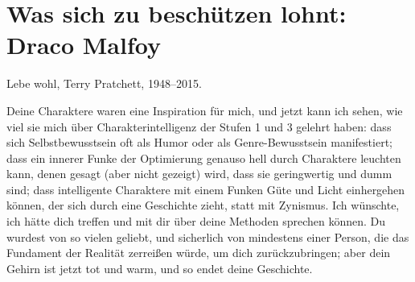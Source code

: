 \chapter{Was sich zu beschützen lohnt: Draco Malfoy}

\begin{chapterOpeningAuthorNote}
Lebe wohl, Terry Pratchett, 1948–2015.

Deine Charaktere waren eine Inspiration für mich, und jetzt kann ich sehen, wie viel sie mich über Charakterintelligenz der Stufen 1 und 3 gelehrt haben: dass sich Selbstbewusstsein oft als Humor oder als Genre-Bewusstsein manifestiert; dass ein innerer Funke der Optimierung genauso hell durch Charaktere leuchten kann, denen gesagt (aber nicht gezeigt) wird, dass sie geringwertig und dumm sind; dass intelligente Charaktere mit einem Funken Güte und Licht einhergehen können, der sich durch eine Geschichte zieht, statt mit Zynismus. Ich wünschte, ich hätte dich treffen und mit dir über deine Methoden sprechen können. Du wurdest von so vielen geliebt, und sicherlich von mindestens einer Person, die das Fundament der Realität zerreißen würde, um dich zurückzubringen; aber dein Gehirn ist jetzt tot und warm, und so endet deine Geschichte.
\begin{verse}

\end{verse}
\end{chapterOpeningAuthorNote}
